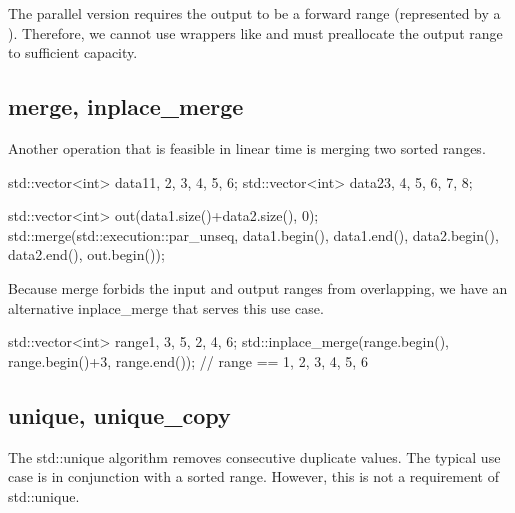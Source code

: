 The parallel version requires the output to be a forward range (represented by a ). Therefore, we cannot use wrappers like  and must preallocate the output range to sufficient capacity.



\subsection{merge, inplace\_merge}

Another operation that is feasible in linear time is merging two sorted ranges.




\begin{box-note}
\begin{cppcode}
std::vector<int> data1{1, 2, 3, 4, 5, 6};
std::vector<int> data2{3, 4, 5, 6, 7, 8};

std::vector<int> out(data1.size()+data2.size(), 0);
std::merge(std::execution::par_unseq,
    data1.begin(), data1.end(),
    data2.begin(), data2.end(),
    out.begin());
\end{cppcode}
\end{box-note}



Because merge forbids the input and output ranges from overlapping, we have an alternative inplace\_merge that serves this use case.

\begin{box-note}
\begin{cppcode}
std::vector<int> range{1, 3, 5, 2, 4, 6};
std::inplace_merge(range.begin(), range.begin()+3, range.end());
// range == { 1, 2, 3, 4, 5, 6 }
\end{cppcode}
\end{box-note}

\subsection{unique, unique\_copy}

The std::unique algorithm removes consecutive duplicate values. The typical use case is in conjunction with a sorted range. However, this is not a requirement of std::unique.

